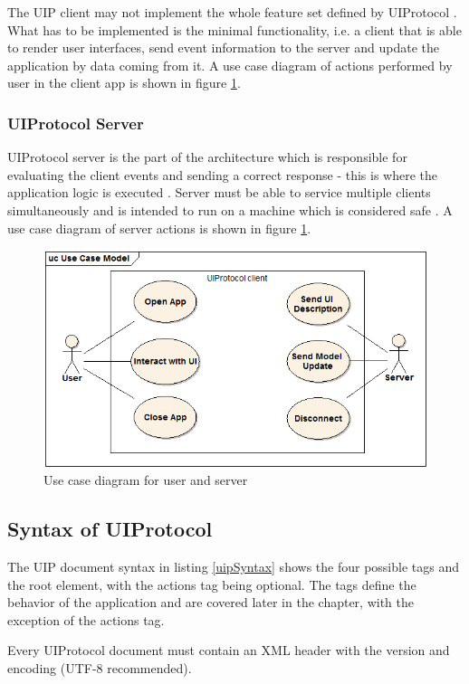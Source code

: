 The UIP client may not implement the whole feature set defined by UIProtocol \cite{uip}. What has to be implemented is the minimal functionality, i.e. a client that is able to render user interfaces, send event information to the server and update the application by data coming from it. A use case diagram of actions performed by user in the client app is shown in figure \ref{fig:UIPusecase}.

\subsubsection{UIProtocol Server}
UIProtocol server is the part of the architecture which is responsible for evaluating the client events and sending a correct response - this is where the application logic is executed \cite{uip}. Server must be able to service multiple clients simultaneously and is intended to run on a machine which is considered safe \cite{uip}. A use case diagram of server actions is shown in figure \ref{fig:UIPusecase}.

\begin{figure}[ht!]
\centering
\includegraphics[width=120mm]{pics/usecase.png}
\caption{Use case diagram for user and server}

\label{fig:UIPusecase}
\end{figure}

\subsection{Syntax of UIProtocol}
The UIP document syntax in listing \ref{uipSyntax} shows the four possible tags and the root element, with the actions tag being optional. The tags define the behavior of the application and are covered later in the chapter, with the exception of the actions tag.

Every UIProtocol document must contain an XML header with the version and encoding (UTF-8 recommended).

